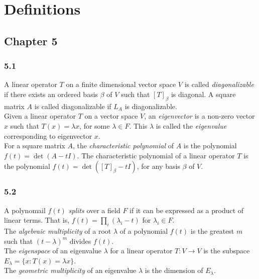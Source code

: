 \documentclass{article}
\begin{document}
\section{Definitions}
\subsection*{Chapter 5}
\subsubsection*{5.1}

A linear operator $T$ on a finite dimensional vector space $V$ is called \textit{diagonalizable} if there exists an ordered basis $\beta$ of $V$ such that $\left[T\right]_{\beta}$ is diagonal. A square matrix $A$ is called diagonalizable if $L_A$ is diagonalizable. \\

Given a linear operator $T$ on a vector space $V$, an \textit{eigenvector} is a non-zero vector $x$ such that $T(x) = \lambda x$, for some $\lambda \in F$. This $\lambda$ is called the \textit{eigenvalue} corresponding to eigenvector $x$. \\

For a square matrix $A$, the \textit{characteristic polynomial} of $A$ is the polynomial $f(t) = \det( A - t I)$. The characteristic polynomial of a linear operator $T$ is the polynomial $f(t) = \det( [T]_\beta - t I)$, for any basis $\beta$ of $V$. \\

\subsubsection*{5.2}

A polynomail $f(t)$ \textit{splits} over a field $F$ if it can be expressed as a product of linear terms. That is, $f(t) = \prod_i (\lambda_i - t)$ for $\lambda_i \in F$. \\

The \textit{algebraic multiplicity} of a root $\lambda$ of a polynomial $f(t)$ is the greatest $m$ such that $(t-\lambda)^m$ divides $f(t)$. \\

The \textit{eigenspace} of an eigenvalue $\lambda$ for a linear operator $T: V \rightarrow V$ is the subspace $E_\lambda = \{x: T(x) = \lambda x\}$. \\


The \textit{geometric multiplicity} of an eigenvalue $\lambda$ is the dimension of $E_\lambda$. \\
\end{document}

